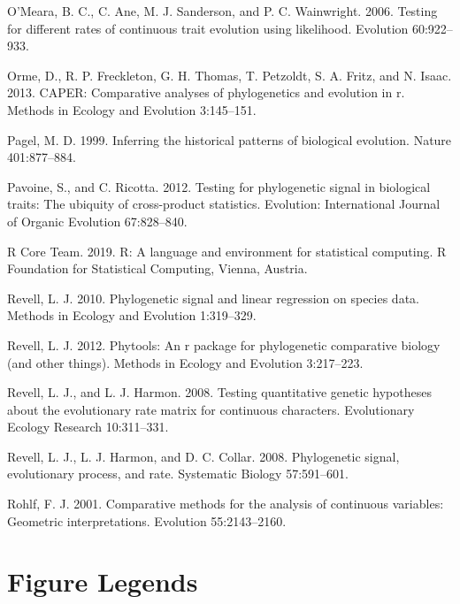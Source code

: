 \documentclass[
]{article}
\begin{document}
\leavevmode\hypertarget{ref-OMeara_et_al2006}{}%
O'Meara, B. C., C. Ane, M. J. Sanderson, and P. C. Wainwright. 2006.
Testing for different rates of continuous trait evolution using
likelihood. Evolution 60:922--933.

\leavevmode\hypertarget{ref-Orme2013}{}%
Orme, D., R. P. Freckleton, G. H. Thomas, T. Petzoldt, S. A. Fritz, and
N. Isaac. 2013. CAPER: Comparative analyses of phylogenetics and
evolution in r. Methods in Ecology and Evolution 3:145--151.

\leavevmode\hypertarget{ref-Pagel1999}{}%
Pagel, M. D. 1999. Inferring the historical patterns of biological
evolution. Nature 401:877--884.

\leavevmode\hypertarget{ref-Pavoine2012}{}%
Pavoine, S., and C. Ricotta. 2012. Testing for phylogenetic signal in
biological traits: The ubiquity of cross-product statistics. Evolution:
International Journal of Organic Evolution 67:828--840.

\leavevmode\hypertarget{ref-RCT}{}%
R Core Team. 2019. R: A language and environment for statistical
computing. R Foundation for Statistical Computing, Vienna, Austria.

\leavevmode\hypertarget{ref-Revell2010}{}%
Revell, L. J. 2010. Phylogenetic signal and linear regression on species
data. Methods in Ecology and Evolution 1:319--329.

\leavevmode\hypertarget{ref-Revell2012}{}%
Revell, L. J. 2012. Phytools: An r package for phylogenetic comparative
biology (and other things). Methods in Ecology and Evolution 3:217--223.

\leavevmode\hypertarget{ref-RevellHarmon2008}{}%
Revell, L. J., and L. J. Harmon. 2008. Testing quantitative genetic
hypotheses about the evolutionary rate matrix for continuous characters.
Evolutionary Ecology Research 10:311--331.

\leavevmode\hypertarget{ref-Revell_et_al2008}{}%
Revell, L. J., L. J. Harmon, and D. C. Collar. 2008. Phylogenetic
signal, evolutionary process, and rate. Systematic Biology 57:591--601.

\leavevmode\hypertarget{ref-Rohlf2001}{}%
Rohlf, F. J. 2001. Comparative methods for the analysis of continuous
variables: Geometric interpretations. Evolution 55:2143--2160.

\newpage

\hypertarget{figure-legends}{%
\section{Figure Legends}\label{figure-legends}}
\end{document}
